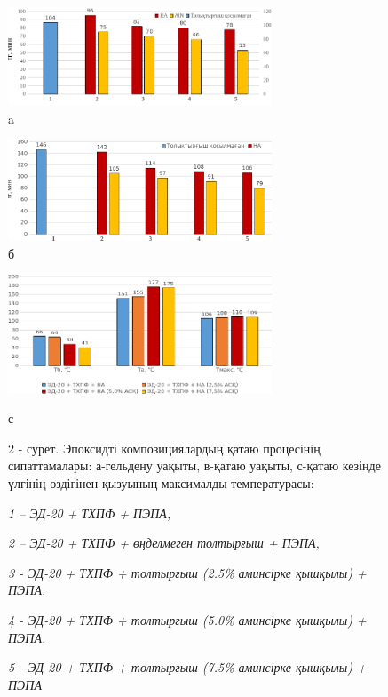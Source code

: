 \begin{figure}[H]
	\centering
	\includegraphics[width=0.7\textwidth]{media/chem/image102}
	\caption*{a}
\end{figure}
\begin{figure}[H]
	\centering
	\includegraphics[width=0.7\textwidth]{media/chem/image103}
	\caption*{б}
\end{figure}
\begin{figure}[H]
	\centering
	\includegraphics[width=0.7\textwidth]{media/chem/image104}
    \caption*{с}
    \caption*{2 - сурет. Эпоксидті композициялардың қатаю процесінің
сипаттамалары: а-гельдену уақыты, в-қатаю уақыты, с-қатаю кезінде
үлгінің өздігінен қызуының максималды температурасы:}
\end{figure}

\begin{figure}[H]
\caption*{\emph{1 -- ЭД-20 + ТХПФ + ПЭПА,}}

\caption*{\emph{2 -- ЭД-20 + ТХПФ + өңделмеген толтырғыш + ПЭПА,}}

\caption*{\emph{3 - ЭД-20 + ТХПФ + толтырғыш (2.5\% аминсірке қышқылы) + ПЭПА,}}

\caption*{\emph{4 - ЭД-20 + ТХПФ + толтырғыш (5.0\% аминсірке қышқылы) + ПЭПА,}}

\caption*{\emph{5 - ЭД-20 + ТХПФ + толтырғыш (7.5\% аминсірке қышқылы) + ПЭПА}}
\end{figure}

